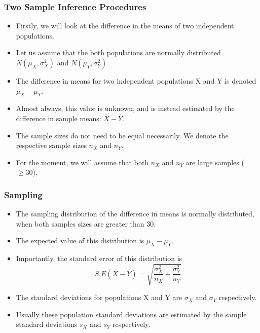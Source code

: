 \begin{frame}
\frametitle{Two Sample Inference Procedures}

\begin{itemize}
\item Firstly, we will look at the difference in the means of two independent populations.
\item Let us assume that the both populations are normally distributed $N(\mu_X,\sigma^2_X)$ and $N(\mu_Y,\sigma^2_Y)$
\item The difference in means for two independent populations X and Y is denoted $\mu_X - \mu_Y$.
\item Almost always, this value is unknown, and is instead estimated by the difference in sample means: $\bar{X} - \bar{Y}.$
\item The sample sizes do not need to be equal necessarily. We denote the respective sample sizes $n_X$ and $n_Y$.
\item For the moment, we will assume that both $n_X$ and $n_Y$ are large samples ($ \geq 30$).
\end{itemize}
\end{frame}
\begin{frame}
\frametitle{Sampling}
\begin{itemize}
\item The sampling distribution of the difference in means is normally distributed, when both samples sizes are greater than 30.
\item The expected value of this distribution is $\mu_X - \mu_Y$.
\item Importantly, the standard error of this distribution is
\[ S.E(\bar{X} - \bar{Y}) = \sqrt{\frac{\sigma^2_X}{n_X} + \frac{\sigma^2_Y}{n_Y}} \]
\item The standard deviations for populations X and Y are $\sigma_X$ and $\sigma_Y$ respectively.
\item Usually these population standard deviations are estimated by the sample standard deviations $s_X$ and $s_Y$ respectively.
\end{itemize}
\end{frame}

